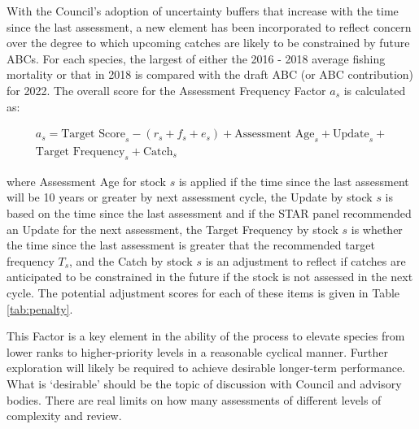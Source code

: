 \documentclass[12pt,]{article}
\begin{document}
With the Council's adoption of uncertainty buffers that increase with
the time since the last assessment, a new element has been incorporated
to reflect concern over the degree to which upcoming catches are likely
to be constrained by future ABCs. For each species, the largest of
either the 2016 - 2018 average fishing mortality or that in 2018 is
compared with the draft ABC (or ABC contribution) for 2022. The overall
score for the Assessment Frequency Factor \(a_s\) is calculated as:

\[
\begin{aligned}
a_s = \text{Target Score}_s - (r_s + f_s + e_s) + \text{Assessment Age}_s + \text{Update}_s + \\
\text{Target Frequency}_s + \text{Catch}_s
\end{aligned}
\]

where Assessment Age for stock \(s\) is applied if the time since the
last assessment will be 10 years or greater by next assessment cycle,
the Update by stock \(s\) is based on the time since the last assessment
and if the STAR panel recommended an Update for the next assessment, the
Target Frequency by stock \(s\) is whether the time since the last
assessment is greater that the recommended target frequency \(T_s\), and
the Catch by stock \(s\) is an adjustment to reflect if catches are
anticipated to be constrained in the future if the stock is not assessed
in the next cycle. The potential adjustment scores for each of these
items is given in Table \ref{tab:penalty}.

This Factor is a key element in the ability of the process to elevate
species from lower ranks to higher-priority levels in a reasonable
cyclical manner. Further exploration will likely be required to achieve
desirable longer-term performance. What is `desirable' should be the
topic of discussion with Council and advisory bodies. There are real
limits on how many assessments of different levels of complexity and
review.
\end{document}
